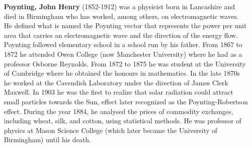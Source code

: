 \textbf{Poynting, John Henry} (1852-1912) was a physicist born in Lancashire and died in Birmingham who has worked, among others, on electromagnetic waves. He defined what is named the Poynting vector that represents the power per unit area that carries an electromagnetic wave and the direction of the energy flow. Poynting followed elementary school in a school run by his father. From 1867 to 1872 he attended  Owen College (now Manchester University) where he had as a professor Osborne Reynolds. From 1872 to 1875 he was student at the University of Cambridge where he obtained the honours in mathematics. In the late 1870s he worked at the Cavendish Laboratory under the direction of James Clerk Maxwell. In 1903 he was the first to realize that solar radiation could attract small particles towards the Sun, effect later recognized as the Poynting-Robertson effect. During the year 1884, he analysed the prices of commodity exchanges, including wheat, silk, and cotton, using statistical methods. He was professor of physics at Mason Science College (which later became the University of Birmingham) until his death.

{}
\label{sec:R}

